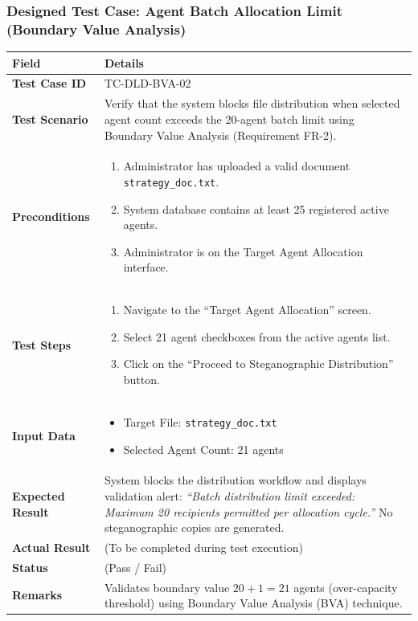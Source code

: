 \documentclass[11pt,a4paper]{article}
\begin{document}
\subsubsection*{Designed Test Case: Agent Batch Allocation Limit (Boundary Value Analysis)}
\noindent
\begin{tabularx}{\textwidth}{|>{\bfseries}p{3.5cm}|X|}
\hline
Field & Details \\
\hline
Test Case ID & TC-DLD-BVA-02 \\
\hline
Test Scenario & Verify that the system blocks file distribution when selected agent count exceeds the 20-agent batch limit using Boundary Value Analysis (Requirement FR-2). \\
\hline
Preconditions & 
\begin{enumerate}[leftmargin=*,nosep]
    \item Administrator has uploaded a valid document \texttt{strategy\_doc.txt}.
    \item System database contains at least 25 registered active agents.
    \item Administrator is on the Target Agent Allocation interface.
\end{enumerate} \\
\hline
Test Steps & 
\begin{enumerate}[leftmargin=*,nosep]
    \item Navigate to the ``Target Agent Allocation'' screen.
    \item Select 21 agent checkboxes from the active agents list.
    \item Click on the ``Proceed to Steganographic Distribution'' button.
\end{enumerate} \\
\hline
Input Data & 
\begin{itemize}[leftmargin=*,nosep]
    \item Target File: \texttt{strategy\_doc.txt}
    \item Selected Agent Count: 21 agents
\end{itemize} \\
\hline
Expected Result & System blocks the distribution workflow and displays validation alert: \textit{``Batch distribution limit exceeded: Maximum 20 recipients permitted per allocation cycle.''} No steganographic copies are generated. \\
\hline
Actual Result & (To be completed during test execution) \\
\hline
Status & (Pass / Fail) \\
\hline
Remarks & Validates boundary value $20 + 1 = 21$ agents (over-capacity threshold) using Boundary Value Analysis (BVA) technique. \\
\hline
\end{tabularx}
\end{document}
